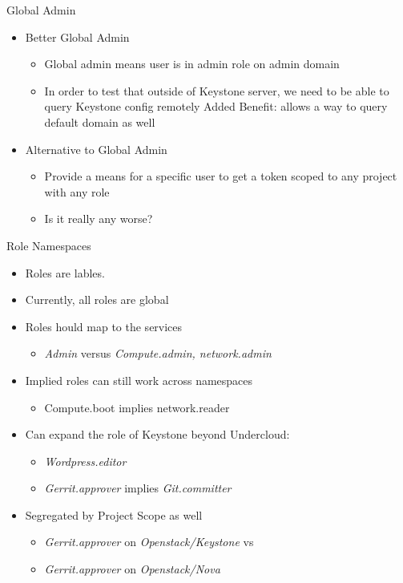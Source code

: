 \documentclass{beamer}
\begin{document}
\begin{frame}{Global Admin}
  \begin{itemize}
  \item   Better Global Admin
    \begin{itemize}
    \item Global admin means user is in admin role on admin domain
    \item In order to test that outside of Keystone server, we need to be able to query Keystone config remotely
      Added Benefit: allows a way to query default domain as well
    \end{itemize}
  \item Alternative to Global Admin
    \begin{itemize}
    \item Provide a means for a specific user to get a token scoped to any project with any role
    \item Is it really any worse?
    \end{itemize}
  \end{itemize}
\end{frame}


\begin{frame}{Role Namespaces}
  \begin{itemize}
  \item Roles are lables.
  \item Currently, all roles are global
  \item Roles hould map to the services
    \begin{itemize}
    \item \textit{Admin} versus \textit{Compute.admin, network.admin}
    \end{itemize}
  \item Implied roles can still work across namespaces
    \begin{itemize}
    \item Compute.boot implies network.reader
    \end{itemize}
  \item Can expand the role of Keystone beyond Undercloud:
    \begin{itemize}
    \item \textit{Wordpress.editor}
    \item \textit{Gerrit.approver}  implies \textit{Git.committer}
    \end{itemize}
  \item Segregated by Project Scope as well
    \begin{itemize}
    \item \textit{Gerrit.approver} on \textit{Openstack/Keystone} vs
    \item \textit{Gerrit.approver} on \textit{Openstack/Nova}
    \end{itemize}
  \end{itemize}
\end{frame}
\end{document}
